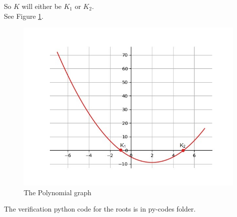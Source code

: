 \documentclass[journal,12pt,twocolumn]{article}\usepackage[margin=1.25 in]{geometry}
\begin{document}
\noindent So $K$ will either be $K_1$ or $K_2$.\\
\noindent See Figure
	  \ref{fig:InkedFigure_1_py_LI.jpg}.\\
\begin{figure}
	  \centering 
	  \includegraphics[width=\columnwidth]{figs/InkedFigure_1_py_LI.jpg}
	  \caption{The Polynomial graph}
	  \label{fig:InkedFigure_1_py_LI.jpg}
	  \end{figure}

\noindent The verification python code for the roots is in py-codes folder.
\end{document}
